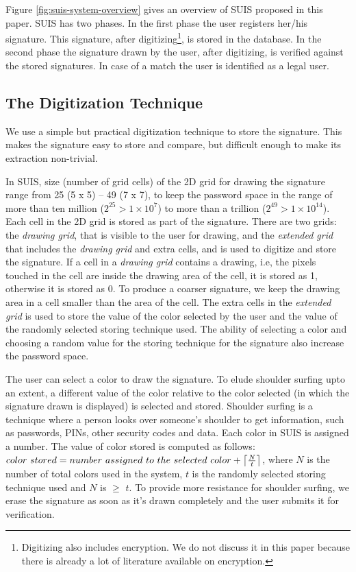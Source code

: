 \documentclass[conference]{IEEEtran}
\DeclarePairedDelimiter\ceil{\lceil}{\rceil}
\begin{document}
Figure \ref{fig:suis-system-overview} gives an overview of SUIS proposed in this paper. SUIS has two phases. In the first phase the user registers her/his signature. This signature, after digitizing\footnote{Digitizing also includes encryption. We do not discuss it in this paper because there is already a lot of literature available on encryption.}, is stored in the database. In the second phase the signature drawn by the user, after digitizing, is verified against the stored signatures. In case of a match the user is identified as a legal user.


\subsection{The Digitization Technique}\label{sec:digitization}

We use a simple but practical digitization technique to store the signature. This makes the signature easy to store and compare, but difficult enough to make its extraction non-trivial.

In SUIS, size (number of grid cells) of the 2D grid for drawing the signature range from 25 (5 x 5) -- 49 (7 x 7), to keep the password space in the range of more than ten million ($2^{25} > 1 \times 10^{7}$) to more than a trillion ($2^{49} > 1 \times 10^{14}$). Each cell in the 2D grid is stored as part of the signature. There are two grids: the \emph{drawing grid}, that is visible to the user for drawing, and the \emph{extended grid} that includes the \emph{drawing grid} and extra cells, and is used to digitize and store the signature. If a cell in a \emph{drawing grid} contains a drawing, i.e, the pixels touched in the cell are inside the drawing area of the cell, it is stored as 1, otherwise it is stored as 0. To produce a coarser signature, we keep the drawing area in a cell smaller than the area of the cell. The extra cells in the \emph{extended grid} is used to store the value of the color selected by the user and the value of the randomly selected storing technique used. The ability of selecting a color and choosing a random value for the storing technique for the signature also increase the password space.

The user can select a color to draw the signature. To elude shoulder surfing upto an extent, a different value of the color relative to the color selected (in which the signature drawn is displayed) is selected and stored. Shoulder surfing is a technique where a person looks over someone's shoulder to get information, such as passwords, PINs, other security codes and data.  Each color in SUIS is assigned a number. The value of color stored is computed as follows: $color \ stored = number \ assigned \ to \ the \ selected \ color + \ceil*{\frac{N}{t}}$, where $N$ is the number of total colors used in the system, $t$ is the randomly selected storing technique used and $N$ is $\geq$ $t$. To provide more resistance for shoulder surfing, we erase the signature as soon as it's drawn completely and the user submits it for verification.
\end{document}
